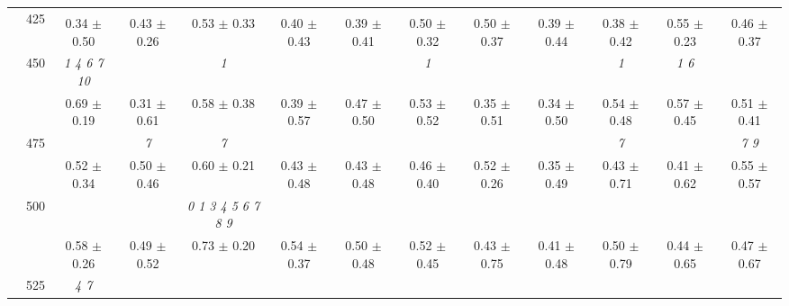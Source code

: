 \begin{table}[h]
{\begin{tabular}{
        ccccccccccccc}
 & \multirow{2}{*}{425}& \cellcolor[HTML]{EFEFEF} & \cellcolor[HTML]{EFEFEF} & \cellcolor[HTML]{EFEFEF} & \cellcolor[HTML]{EFEFEF} & \cellcolor[HTML]{EFEFEF} & \cellcolor[HTML]{EFEFEF} & \cellcolor[HTML]{EFEFEF} & \cellcolor[HTML]{EFEFEF} & \cellcolor[HTML]{EFEFEF} & \cellcolor[HTML]{EFEFEF} & \cellcolor[HTML]{EFEFEF}  \\ 
 & & \cellcolor[HTML]{EFEFEF} 0.34 $\pm$ 0.50& \cellcolor[HTML]{EFEFEF} 0.43 $\pm$ 0.26& \cellcolor[HTML]{EFEFEF} 0.53 $\pm$ 0.33& \cellcolor[HTML]{EFEFEF} 0.40 $\pm$ 0.43& \cellcolor[HTML]{EFEFEF} 0.39 $\pm$ 0.41& \cellcolor[HTML]{EFEFEF} 0.50 $\pm$ 0.32& \cellcolor[HTML]{EFEFEF} 0.50 $\pm$ 0.37& \cellcolor[HTML]{EFEFEF} 0.39 $\pm$ 0.44& \cellcolor[HTML]{EFEFEF} 0.38 $\pm$ 0.42& \cellcolor[HTML]{EFEFEF} 0.55 $\pm$ 0.23& \cellcolor[HTML]{EFEFEF} 0.46 $\pm$ 0.37 \\ 
 & \multirow{2}{*}{450}& \textit{  1  4  6  7 10 }& & \textit{ 1 }& & & \textit{ 1 }& & & \textit{ 1 }& \textit{ 1 6 }&  \\ 
 & & 0.69 $\pm$ 0.19& 0.31 $\pm$ 0.61& 0.58 $\pm$ 0.38& 0.39 $\pm$ 0.57& 0.47 $\pm$ 0.50& 0.53 $\pm$ 0.52& 0.35 $\pm$ 0.51& 0.34 $\pm$ 0.50& 0.54 $\pm$ 0.48& 0.57 $\pm$ 0.45& 0.51 $\pm$ 0.41 \\ 
 & \multirow{2}{*}{475}& \cellcolor[HTML]{EFEFEF} & \cellcolor[HTML]{EFEFEF} \textit{ 7 }& \cellcolor[HTML]{EFEFEF} \textit{ 7 }& \cellcolor[HTML]{EFEFEF} & \cellcolor[HTML]{EFEFEF} & \cellcolor[HTML]{EFEFEF} & \cellcolor[HTML]{EFEFEF} & \cellcolor[HTML]{EFEFEF} & \cellcolor[HTML]{EFEFEF} \textit{ 7 }& \cellcolor[HTML]{EFEFEF} & \cellcolor[HTML]{EFEFEF} \textit{ 7 9 } \\ 
 & & \cellcolor[HTML]{EFEFEF} 0.52 $\pm$ 0.34& \cellcolor[HTML]{EFEFEF} 0.50 $\pm$ 0.46& \cellcolor[HTML]{EFEFEF} 0.60 $\pm$ 0.21& \cellcolor[HTML]{EFEFEF} 0.43 $\pm$ 0.48& \cellcolor[HTML]{EFEFEF} 0.43 $\pm$ 0.48& \cellcolor[HTML]{EFEFEF} 0.46 $\pm$ 0.40& \cellcolor[HTML]{EFEFEF} 0.52 $\pm$ 0.26& \cellcolor[HTML]{EFEFEF} 0.35 $\pm$ 0.49& \cellcolor[HTML]{EFEFEF} 0.43 $\pm$ 0.71& \cellcolor[HTML]{EFEFEF} 0.41 $\pm$ 0.62& \cellcolor[HTML]{EFEFEF} 0.55 $\pm$ 0.57 \\ 
 & \multirow{2}{*}{500}& & & \textit{ 0 1 3 4 5 6 7 8 9 }& & & & & & & &  \\ 
 & & 0.58 $\pm$ 0.26& 0.49 $\pm$ 0.52& 0.73 $\pm$ 0.20& 0.54 $\pm$ 0.37& 0.50 $\pm$ 0.48& 0.52 $\pm$ 0.45& 0.43 $\pm$ 0.75& 0.41 $\pm$ 0.48& 0.50 $\pm$ 0.79& 0.44 $\pm$ 0.65& 0.47 $\pm$ 0.67 \\ 
 & \multirow{2}{*}{525}& \cellcolor[HTML]{EFEFEF} \textit{ 4 7 }& \cellcolor[HTML]{EFEFEF} & \cellcolor[HTML]{EFEFEF} & \cellcolor[HTML]{EFEFEF} & \cellcolor[HTML]{EFEFEF} & \cellcolor[HTML]{EFEFEF} & \cellcolor[HTML]{EFEFEF} & \cellcolor[HTML]{EFEFEF} & \cellcolor[HTML]{EFEFEF} & \cellcolor[HTML]{EFEFEF} & \cellcolor[HTML]{EFEFEF}  \\ 

\end{tabular}}
\end{table}
